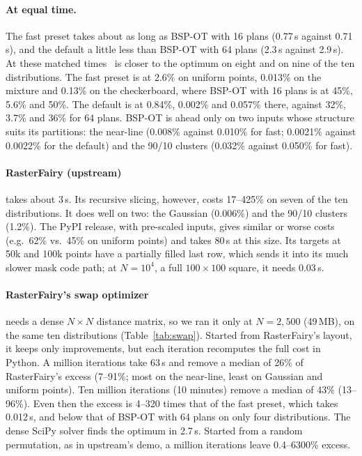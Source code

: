 \paragraph{At equal time.} The fast preset takes about as long as BSP-OT with 16 plans (0.77\,s
against 0.71\,s), and the default a little less than BSP-OT with 64 plans (2.3\,s against
2.9\,s). At these matched times \ShuffleSnap\ is closer to the optimum on eight and on nine of
the ten distributions. The fast preset is at 2.6\% on uniform points, 0.013\% on the mixture
and 0.13\% on the checkerboard, where BSP-OT with 16 plans is at 45\%, 5.6\% and 50\%. The
default is at 0.84\%, 0.002\% and 0.057\% there, against 32\%, 3.7\% and 36\% for 64 plans.
BSP-OT is ahead only on two inputs whose structure suits its partitions: the near-line (0.008\%
against 0.010\% for fast; 0.0021\% against 0.0022\% for the default) and the 90/10 clusters
(0.032\% against 0.050\% for fast).

\paragraph{RasterFairy (upstream)} takes about 3\,s. Its recursive slicing, however, costs
17--425\% on seven of the ten distributions. It does well on two: the Gaussian (0.006\%) and
the 90/10 clusters (1.2\%).
The PyPI release, with pre-scaled inputs, gives similar or worse costs (e.g.\ 62\% vs.\ 45\%
on uniform points) and takes 80\,s at this size. Its targets at 50k and 100k points have a partially filled
last row, which sends it into its much slower mask code path; at $N=10^4$, a full
$100\times100$ square, it needs 0.03\,s.

\paragraph{RasterFairy's swap optimizer} needs a dense $N\times N$ distance matrix, so we ran
it only at $N=2{,}500$ (49\,MB), on the same ten distributions (Table~\ref{tab:swap}). Started
from RasterFairy's layout, it keeps only improvements, but each iteration recomputes the full
cost in Python. A million iterations take 63\,s and remove a median of 26\% of
RasterFairy's excess (7--91\%; most on the near-line, least on Gaussian and uniform points). Ten million iterations
(10 minutes) remove a median of 43\% (13--96\%). Even then the excess is 4--320 times that of
the fast preset, which takes 0.012\,s, and below that of BSP-OT with 64 plans on only four
distributions. The dense SciPy solver finds the
optimum in 2.7\,s. Started from a random permutation, as in upstream's demo, a million
iterations leave 0.4--6300\% excess.

